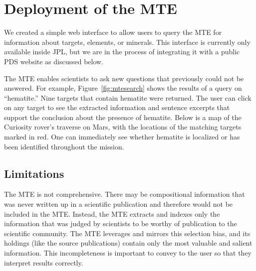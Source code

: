 \documentclass[letterpaper]{article} %
\begin{document}
\section{Deployment of the MTE}

We created a simple web interface to allow users to query the MTE for
information about targets, elements, or minerals.  This interface is
currently only available inside JPL, but we are in the process of
integrating it with a public PDS website as discussed below.

The MTE enables scientists to ask new questions that previously could
not be answered.  For example, Figure~\ref{fig:mtesearch} shows the
results of a query on ``hematite.''  Nine targets that contain
hematite were returned.  The user can click on any target to see the
extracted information and sentence excerpts that support the
conclusion about the presence of hematite.  Below is a map
of the Curiosity rover's traverse on Mars, with the locations of the
matching targets marked in red.  One can immediately see whether
hematite is localized or has been identified throughout the mission.

\subsection{Limitations}

The MTE is not comprehensive.  There may be compositional information
that was never written up in a scientific publication and therefore
would not be included in the MTE.  Instead, the MTE extracts and
indexes only the information that was judged by scientists to be
worthy of publication to the scientific community.  The MTE leverages
and mirrors this selection bias, and its holdings (like the source
publications) contain only the most valuable and salient information.
This incompleteness is important to convey to the user so that
they interpret results correctly.
\end{document}
